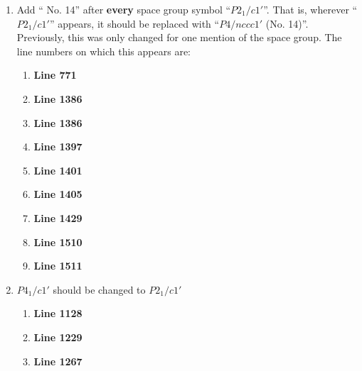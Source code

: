 \documentclass[aps,reprint,notitlepage,onecolumn,12pt]{revtex4-2}
\numberwithin{equation}{section}
\begin{document}
\begin{enumerate}
\begin{enumerate}
        
        
        
    \end{enumerate}
    \item Add `` No. 14'' after \textbf{every} space group symbol ``$P2_1/c1'$''. That is, wherever ``$P2_1/c1'$'' appears, it should be replaced with ``$P4/nccc1'$ (No. 14)''. Previously, this was only changed for one mention of the space group. The line numbers on which this appears are:
    \begin{enumerate}
        \item \textbf{Line 771}
        \item \textbf{Line 1386}
        \item \textbf{Line 1386}
        \item \textbf{Line 1397}
        \item \textbf{Line 1401}
        \item \textbf{Line 1405}
        \item \textbf{Line 1429}
        
        \item \textbf{Line 1510}
        \item \textbf{Line 1511}
    \end{enumerate}
    \item $P4_1/c1'$ should be changed to $P2_1/c1'$
        \begin{enumerate}
            \item \textbf{Line 1128}
            \item \textbf{Line 1229}
            \item \textbf{Line 1267}
        \end{enumerate}
\end{enumerate}
\end{document}

